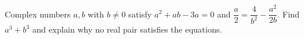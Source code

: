 Complex numbers $a,b$ with $b\ne0$ satisfy $a^2+ab-3a=0$ and $\dfrac{a}{2}=\dfrac{4}{b^2}-\dfrac{a^2}{2b}$. Find $a^3+b^3$ and explain why no real pair satisfies the equations.
